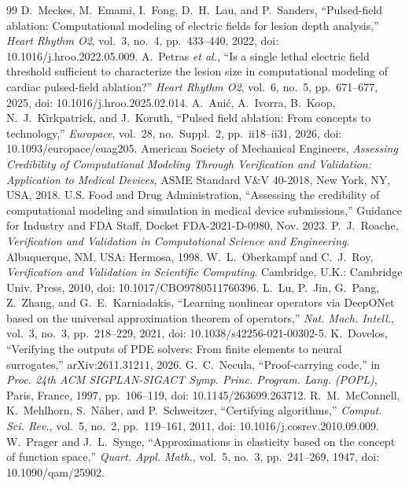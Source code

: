 \documentclass[11pt]{article}
\begin{document}
\begin{thebibliography}{99}
 D.~Meckes, M.~Emami, I.~Fong, D.~H.~Lau, and P.~Sanders, ``Pulsed-field ablation: Computational modeling of electric fields for lesion depth analysis,'' \emph{Heart Rhythm O2}, vol.~3, no.~4, pp.~433--440, 2022, doi: 10.1016/j.hroo.2022.05.009.
 A.~Petras \emph{et al.}, ``Is a single lethal electric field threshold sufficient to characterize the lesion size in computational modeling of cardiac pulsed-field ablation?'' \emph{Heart Rhythm O2}, vol.~6, no.~5, pp.~671--677, 2025, doi: 10.1016/j.hroo.2025.02.014.
 A.~Ani\'{c}, A.~Ivorra, B.~Koop, N.~J.~Kirkpatrick, and J.~Koruth, ``Pulsed field ablation: From concepts to technology,'' \emph{Europace}, vol.~28, no.~Suppl.~2, pp.~ii18--ii31, 2026, doi: 10.1093/europace/euag205.
 American Society of Mechanical Engineers, \emph{Assessing Credibility of Computational Modeling Through Verification and Validation: Application to Medical Devices}, ASME Standard V\&V 40-2018, New York, NY, USA, 2018.
 U.S. Food and Drug Administration, ``Assessing the credibility of computational modeling and simulation in medical device submissions,'' Guidance for Industry and FDA Staff, Docket FDA-2021-D-0980, Nov. 2023.
 P.~J.~Roache, \emph{Verification and Validation in Computational Science and Engineering}. Albuquerque, NM, USA: Hermosa, 1998.
 W.~L.~Oberkampf and C.~J.~Roy, \emph{Verification and Validation in Scientific Computing}. Cambridge, U.K.: Cambridge Univ. Press, 2010, doi: 10.1017/CBO9780511760396.
 L.~Lu, P.~Jin, G.~Pang, Z.~Zhang, and G.~E.~Karniadakis, ``Learning nonlinear operators via DeepONet based on the universal approximation theorem of operators,'' \emph{Nat. Mach. Intell.}, vol.~3, no.~3, pp.~218--229, 2021, doi: 10.1038/s42256-021-00302-5.
 K.~Dovelos, ``Verifying the outputs of PDE solvers: From finite elements to neural surrogates,'' arXiv:2611.31211, 2026.
 G.~C.~Necula, ``Proof-carrying code,'' in \emph{Proc. 24th ACM SIGPLAN-SIGACT Symp. Princ. Program. Lang. (POPL)}, Paris, France, 1997, pp.~106--119, doi: 10.1145/263699.263712.
 R.~M.~McConnell, K.~Mehlhorn, S.~N\"aher, and P.~Schweitzer, ``Certifying algorithms,'' \emph{Comput. Sci. Rev.}, vol.~5, no.~2, pp.~119--161, 2011, doi: 10.1016/j.cosrev.2010.09.009.
 W.~Prager and J.~L.~Synge, ``Approximations in elasticity based on the concept of function space,'' \emph{Quart. Appl. Math.}, vol.~5, no.~3, pp.~241--269, 1947, doi: 10.1090/qam/25902.

\end{thebibliography}
\end{document}
